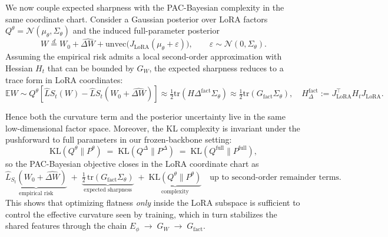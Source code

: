 \documentclass{article} %
\begin{document}
We now couple expected sharpness with the PAC-Bayesian complexity in the same coordinate chart. 
Consider a Gaussian posterior over LoRA factors $Q^\theta=\mathcal{N}(\mu_\theta,\Sigma_\theta)$ and the induced full-parameter posterior 
\[
W \stackrel{d}{=} W_0 + \widehat{\Delta W} + \mathrm{unvec}\!\big(J_{\mathrm{LoRA}}(\mu_\theta+\varepsilon)\big),
\qquad \varepsilon\sim\mathcal{N}(0,\Sigma_\theta).
\]
Assuming the empirical risk admits a local second-order approximation with Hessian $H_t$ that can be bounded by $G_W$, the expected sharpness reduces to a trace form in LoRA coordinates:
\begin{equation}
\label{eq:esh-trace}
\mathbb{E}{W \sim Q^\theta}\left[\hat{L}{S_t}(W) - \hat{L}{S_t}(W_0 + \widehat{\Delta W})\right]
\approx \tfrac12 \mathrm{tr}\left(H\Delta^{\mathrm{fact}} \Sigma_\theta\right)
\approx \tfrac12 \mathrm{tr}\left(G_{\mathrm{fact}} \Sigma_\theta\right),
\quad
H_\Delta^{\mathrm{fact}} := J_{\mathrm{LoRA}}^\top H_t J_{\mathrm{LoRA}}.
\end{equation}


Hence both the curvature term and the posterior uncertainty live in the same low-dimensional factor space. 
Moreover, the KL complexity is invariant under the pushforward to full parameters in our frozen-backbone setting:
\[
\mathrm{KL}(Q^\theta\|P^\theta) \;=\; \mathrm{KL}(Q^{\Delta}\|P^{\Delta})
\;=\; \mathrm{KL}(Q^{\mathrm{full}}\|P^{\mathrm{full}}),
\]
so the PAC-Bayesian objective closes in the LoRA coordinate chart as
\[
\underbrace{\hat L_{S_t}(W_0+\widehat{\Delta W})}_{\text{empirical risk}}
\;+\;
\underbrace{\tfrac12\,\mathrm{tr}(G_{\mathrm{fact}}\Sigma_\theta)}_{\text{expected sharpness}}
\;+\;
\underbrace{\mathrm{KL}(Q^\theta\|P^\theta)}_{\text{complexity}}
\quad\text{up to second-order remainder terms}.
\]
This shows that optimizing flatness \emph{only} inside the LoRA subspace is sufficient to control the effective curvature seen by training, which in turn stabilizes the shared features through the chain 
$E_\phi \;\to\; G_W \;\to\; G_{\mathrm{fact}}$.
\end{document}
